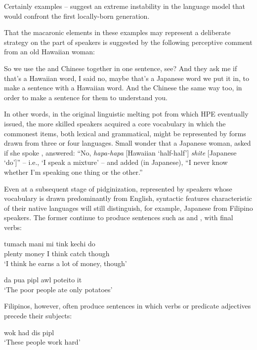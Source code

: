 Certainly examples -- suggest an extreme instability in the language model that would confront the first locally-born generation.

That the macaronic elements in these examples may represent a deliber\-ate strategy on the part of speakers is suggested by the following perceptive comment from an old Hawaiian woman:

\ea\label{ex:5}
So we use the  and Chinese together in one sentence, see? And they ask me if that's a Hawaiian word, I said no, maybe that's a Japanese word we put it in, to make a sentence with a Hawaiian word. And the Chinese the same way too, in order to make a sentence for them to understand you.
\z

\noindent In other words, in the original linguistic melting pot from which HPE eventually issued, the more skilled speakers acquired a core vocabulary in which the commonest items, both lexical and grammatical, might be represented by forms drawn from three or four languages. Small wonder that a Japanese woman, asked if she spoke , answered: ``No, \textit{hapa-hapa} [Hawaiian `half-half'] \textit{shite} [Japanese `do']'' -- i.e., `I speak a mixture' -- and added (in Japanese), ``I never know whether I'm speaking one thing or the other.''

Even at a subsequent stage of pidginization, represented by speakers whose vocabulary is drawn predominantly from English, syntactic features characteristic of their native languages will still distinguish, for example, Japanese from Filipino speakers. The former continue to produce sentences such as  and , with final verbs:

\ea\label{ex:6}
\gll tumach mani mi tink kechi do\\
 plenty money I think catch though\\
\glt  `I think he earns a lot of money, though'
\z

\ea\label{ex:7}
da pua pipl awl poteito it \\
\glt `The poor people ate only potatoes'
\z

\noindent Filipinos, however, often produce sentences in which verbs or predicate adjectives precede their subjects:

\ea\label{ex:8}
 wok had dis pipl\\
\glt  `These people work hard'
\z


